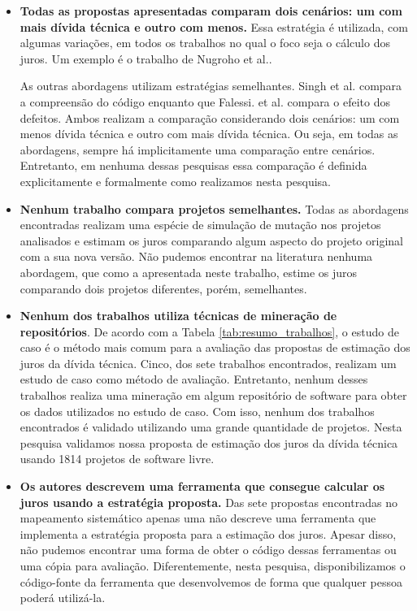 \begin{itemize}

\item \textbf{Todas as propostas apresentadas comparam dois cenários: um com mais dívida técnica e outro com menos.} Essa estratégia é utilizada, com algumas variações, em todos os trabalhos no qual o foco seja o cálculo dos juros. Um exemplo é o trabalho de Nugroho et al.\cite{nugroho2011empirical}. 

As outras abordagens utilizam estratégias semelhantes. Singh et al.\cite{singh2014framework} compara a compreensão do código enquanto que Falessi. et al. \cite{falessi2015towards} compara o efeito dos defeitos. Ambos realizam a comparação considerando dois cenários: um com menos dívida técnica e outro com mais dívida técnica. Ou seja, em todas as abordagens, sempre há implicitamente uma comparação entre cenários. Entretanto, em nenhuma dessas pesquisas essa comparação é definida explicitamente e formalmente como realizamos nesta pesquisa. 


\item \textbf{Nenhum trabalho compara projetos semelhantes.} Todas as abordagens encontradas realizam uma espécie de simulação de mutação nos projetos analisados e estimam os juros comparando algum aspecto do projeto original com a sua nova versão. Não pudemos encontrar na literatura nenhuma abordagem, que como a apresentada neste trabalho, estime os juros comparando dois projetos diferentes, porém, semelhantes. 

\item \textbf{Nenhum dos trabalhos utiliza técnicas de mineração de repositórios}.  De acordo com a Tabela \ref{tab:resumo_trabalhos}, o estudo de caso é o método mais comum para a avaliação das propostas de estimação dos juros da dívida técnica. Cinco, dos sete trabalhos encontrados, realizam um estudo de caso como método de avaliação. Entretanto, nenhum desses trabalhos realiza uma mineração em algum repositório de software para obter os dados utilizados no estudo de caso. Com isso, nenhum dos trabalhos encontrados é validado utilizando uma grande quantidade de projetos. Nesta pesquisa validamos nossa proposta de estimação dos juros da dívida técnica usando 1814 projetos de software livre. 
\item \textbf{Os autores descrevem uma ferramenta que consegue calcular os juros usando a estratégia proposta.} Das sete propostas encontradas no mapeamento sistemático apenas uma não descreve uma ferramenta que implementa a estratégia proposta para a estimação dos juros. Apesar disso, não pudemos encontrar uma forma de obter o código dessas ferramentas ou uma cópia para avaliação. Diferentemente, nesta pesquisa, disponibilizamos o código-fonte da ferramenta que desenvolvemos de forma que qualquer pessoa poderá utilizá-la.
 

\end{itemize}
